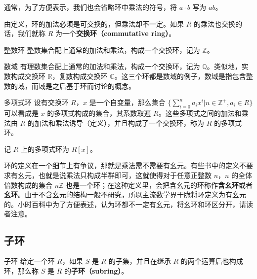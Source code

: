 通常，为了方便表示，我们也会省略环中乘法的符号，将 $a\cdot b$ 写为 $ab$。

由定义，环的加法必须是可交换的，但乘法却不一定。如果 $R$ 的乘法也交换的话，我们就称 $R$ 为一个\textbf{交换环（commutative ring）}。

\begin{example}{整数环}
整数集合配上通常的加法和乘法，构成一个交换环，记为 $\mathbb{Z}$。
\end{example}

\begin{example}{数域}
有理数集合配上通常的加法和乘法，构成一个交换环，记为 $\mathbb{Q}$。类似地，实数构成交换环 $\mathbb{R}$，复数构成交换环 $\mathbb{C}$。这三个环都是数域的例子，数域是指包含整数的域，而域是之后基于环而讨论的概念。
\end{example}

\begin{example}{多项式环}\label{ex_Ring_1}
设有交换环 $R$，$x$ 是一个自变量，那么集合 $\{\sum\limits_{i=0}^n a_ix^i|n\in\mathbb{Z}^+, a_i\in R\}$ 可以看成是 $x$ 的多项式构成的集合，其系数取遍 $R$。这些多项式之间的加法和乘法由 $R$ 的加法和乘法诱导（定义），并且构成了一个交换环，称为 $R$ 的多项式环。

记 $R$ 上的多项式环为 $R[x]$。
\end{example}

环的定义在一个细节上有争议，那就是乘法需不需要有幺元。有些书中的定义不要求有幺元，也就是说乘法只构成半群即可，这就使得对于任意正整数 $n$，$n$ 的全体倍数构成的集合 $n\mathbb{Z}$ 也是一个环；在这种定义里，会把含幺元的环称作\textbf{含幺环}或者\textbf{幺环}。由于不含幺元的结构一般不研究，所以主流数学界干脆将环定义为有幺元的。小时百科中为了方便表述，认为环都不一定有幺元，将幺环和环区分开，请读者注意。

\subsection{子环}

\begin{definition}{子环}
给定一个环 $R$，如果 $S$ 是 $R$ 的子集，并且在继承 $R$ 的两个运算后也构成环，那么称 $S$ 是 $R$ 的\textbf{子环（subring）}。
\end{definition}



